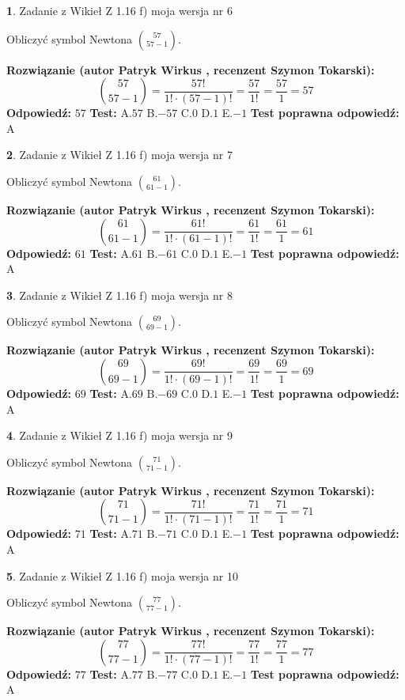 \documentclass[12pt, a4paper]{article}
\theoremstyle{definition} %
\newtheorem{zad}{}
\newcommand{\zadStart}[1]{\begin{zad}#1\newline}
\newcommand{\zadStop}{\end{zad}}
\newcommand{\rozwStart}[2]{\noindent \textbf{Rozwiązanie (autor #1 , recenzent #2): }\newline}
\newcommand{\rozwStop}{\newline}
\newcommand{\odpStart}{\noindent \textbf{Odpowiedź:}\newline}
\newcommand{\odpStop}{\newline}
\newcommand{\testStart}{\noindent \textbf{Test:}\newline}
\newcommand{\testStop}{\newline}
\newcommand{\kluczStart}{\noindent \textbf{Test poprawna odpowiedź:}\newline}
\newcommand{\kluczStop}{\newline}
\begin{document}
\zadStart{Zadanie z Wikieł Z 1.16 f) moja wersja nr 6}

Obliczyć symbol Newtona ${57 \choose 57-1}$.
\zadStop
\rozwStart{Patryk Wirkus}{Szymon Tokarski}
$${57 \choose 57-1} = \frac{57!}{1! \cdot (57-1)!} = \frac{57}{1!} = \frac{57}{1} = 57$$
\rozwStop
\odpStart
$57$
\odpStop
\testStart
A.$57$ B.$-57$ C.$0$ D.$1$ E.$-1$
\testStop
\kluczStart
A
\kluczStop



\zadStart{Zadanie z Wikieł Z 1.16 f) moja wersja nr 7}

Obliczyć symbol Newtona ${61 \choose 61-1}$.
\zadStop
\rozwStart{Patryk Wirkus}{Szymon Tokarski}
$${61 \choose 61-1} = \frac{61!}{1! \cdot (61-1)!} = \frac{61}{1!} = \frac{61}{1} = 61$$
\rozwStop
\odpStart
$61$
\odpStop
\testStart
A.$61$ B.$-61$ C.$0$ D.$1$ E.$-1$
\testStop
\kluczStart
A
\kluczStop



\zadStart{Zadanie z Wikieł Z 1.16 f) moja wersja nr 8}

Obliczyć symbol Newtona ${69 \choose 69-1}$.
\zadStop
\rozwStart{Patryk Wirkus}{Szymon Tokarski}
$${69 \choose 69-1} = \frac{69!}{1! \cdot (69-1)!} = \frac{69}{1!} = \frac{69}{1} = 69$$
\rozwStop
\odpStart
$69$
\odpStop
\testStart
A.$69$ B.$-69$ C.$0$ D.$1$ E.$-1$
\testStop
\kluczStart
A
\kluczStop



\zadStart{Zadanie z Wikieł Z 1.16 f) moja wersja nr 9}

Obliczyć symbol Newtona ${71 \choose 71-1}$.
\zadStop
\rozwStart{Patryk Wirkus}{Szymon Tokarski}
$${71 \choose 71-1} = \frac{71!}{1! \cdot (71-1)!} = \frac{71}{1!} = \frac{71}{1} = 71$$
\rozwStop
\odpStart
$71$
\odpStop
\testStart
A.$71$ B.$-71$ C.$0$ D.$1$ E.$-1$
\testStop
\kluczStart
A
\kluczStop



\zadStart{Zadanie z Wikieł Z 1.16 f) moja wersja nr 10}

Obliczyć symbol Newtona ${77 \choose 77-1}$.
\zadStop
\rozwStart{Patryk Wirkus}{Szymon Tokarski}
$${77 \choose 77-1} = \frac{77!}{1! \cdot (77-1)!} = \frac{77}{1!} = \frac{77}{1} = 77$$
\rozwStop
\odpStart
$77$
\odpStop
\testStart
A.$77$ B.$-77$ C.$0$ D.$1$ E.$-1$
\testStop
\kluczStart
A
\kluczStop
\end{document}
